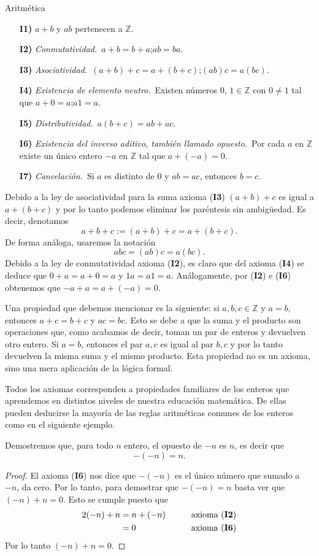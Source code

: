 \begin{section}{Aritmética}
\begin{enumerate}
\item[\textbf{I1)}] $a+b$ y $ab$ pertenecen a ${\mathbb Z}$.
\item[\textbf{I2)}] {\em Conmutatividad.}\, $a+b = b+a$;\qquad $ab=ba$. 
\item[\textbf{I3)}] {\em Asociatividad.}\, $(a+b)+c = a+(b+c)$;\qquad $(ab)c = a(bc)$. 
\item[\textbf{I4)}] {\em Existencia de elemento neutro.}\, Existen números $0$, $1 \in \mathbb Z$ con $0\not=1$ tal que $a+0=a$;\qquad $a1=a$. 
\item[\textbf{I5)}] {\em Distributividad.}\, $a(b+c)=ab+ac$. 
\item[\textbf{I6)}] {\em Existencia del inverso aditivo, también llamado opuesto.}\, Por cada $a$ en ${\mathbb Z}$ existe un único entero $-a$ en ${\mathbb Z}$ tal que $a+(-a)=0$. 
\item[\textbf{I7)}] {\em Cancelación.}\, Si $a$ es distinto de $0$ y $ab=ac$, entonces $b=c$. 
\end{enumerate}


Debido a la ley de asociatividad para la suma axioma (\textbf{I3}) $(a+b)+c$ es igual a $a+(b+c)$ y por lo tanto podemos eliminar los paréntesis sin ambigüedad. Es decir, denotamos
$$
a+b+c := (a+b)+c = a+(b+c).
$$
De forma análoga, usaremos la notación
$$
abc = (ab)c = a(bc).
$$
Debido a la ley de conmutatividad axioma (\textbf{I2}), es claro que  del axioma (\textbf{I4}) se deduce que  $0+a=a+0=a$ y $1a = a1=a$. Análogamente,  por  (\textbf{I2}) e  (\textbf{I6}) obtenemos que  $-a+a =    a+(-a)=0$.

Una propiedad que debemos mencionar es la siguiente: si $a,b, c \in \mathbb Z$  y $a=b$, entonces $a+c = b+c$ y $ac = bc$. Esto se debe a que la suma y el producto son operaciones que, como acabamos de decir, toman un par de enteros y  devuelven otro entero. Si $a=b$, entonces el  par $a,c$ es igual al par $b,c$ y por lo tanto devuelven la misma suma y el mismo producto. Esta propiedad no es un axioma, sino  una mera aplicación de la lógica formal. 
  
Todos los axiomas corresponden a propiedades familiares de los  enteros que aprendemos en distintos niveles de nuestra educación  matemática. De ellas pueden deducirse la mayoría de las reglas  aritméticas comunes de los enteros como en el siguiente ejemplo.

\begin{ejemplo}\label{Ej.opuesto_opuesto} Demostremos que, para todo $n$ entero, el opuesto de $-n$ es $n$, es decir que 
$$-(-n) = n.$$ 
\end{ejemplo}
\begin{proof} El axioma (\textbf{I6}) nos dice que $-(-n)$ es el único número que sumado a $-n$, da cero.  Por lo tanto, para demostrar que $-(-n) = n$ basta ver que $(-n)+n=0$. Esto se cumple puesto que 
\begin{alignat*}2
(-n)+n&=n+(-n) &\qquad &\text{axioma (\textbf{I2})} \\
&=0&\qquad &\text{axioma (\textbf{I6})}
\end{alignat*}
Por lo tanto  $(-n)+n=0$.
\end{proof}


\end{section}
